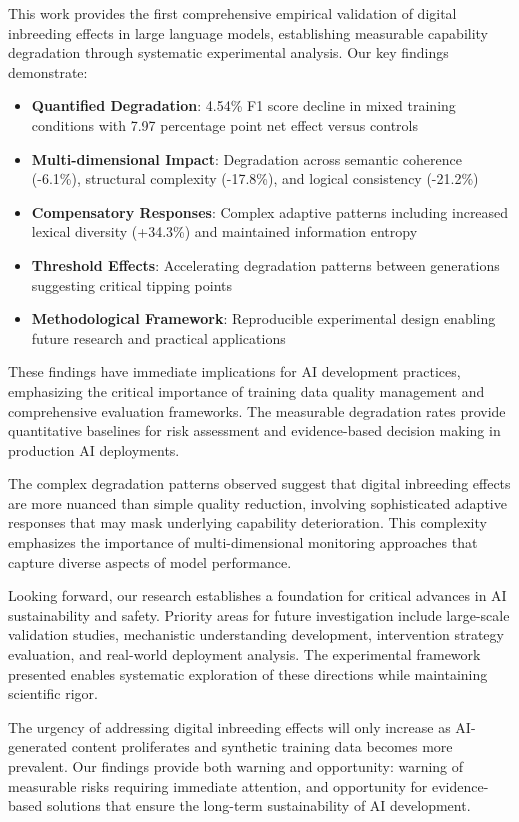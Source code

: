 \documentclass[11pt]{article}
\begin{document}
This work provides the first comprehensive empirical validation of digital inbreeding effects in large language models, establishing measurable capability degradation through systematic experimental analysis. Our key findings demonstrate:

\begin{itemize}
    \item \textbf{Quantified Degradation}: 4.54\% F1 score decline in mixed training conditions with 7.97 percentage point net effect versus controls
    \item \textbf{Multi-dimensional Impact}: Degradation across semantic coherence (-6.1\%), structural complexity (-17.8\%), and logical consistency (-21.2\%)
    \item \textbf{Compensatory Responses}: Complex adaptive patterns including increased lexical diversity (+34.3\%) and maintained information entropy
    \item \textbf{Threshold Effects}: Accelerating degradation patterns between generations suggesting critical tipping points
    \item \textbf{Methodological Framework}: Reproducible experimental design enabling future research and practical applications
\end{itemize}

These findings have immediate implications for AI development practices, emphasizing the critical importance of training data quality management and comprehensive evaluation frameworks. The measurable degradation rates provide quantitative baselines for risk assessment and evidence-based decision making in production AI deployments.

The complex degradation patterns observed suggest that digital inbreeding effects are more nuanced than simple quality reduction, involving sophisticated adaptive responses that may mask underlying capability deterioration. This complexity emphasizes the importance of multi-dimensional monitoring approaches that capture diverse aspects of model performance.

Looking forward, our research establishes a foundation for critical advances in AI sustainability and safety. Priority areas for future investigation include large-scale validation studies, mechanistic understanding development, intervention strategy evaluation, and real-world deployment analysis. The experimental framework presented enables systematic exploration of these directions while maintaining scientific rigor.

The urgency of addressing digital inbreeding effects will only increase as AI-generated content proliferates and synthetic training data becomes more prevalent. Our findings provide both warning and opportunity: warning of measurable risks requiring immediate attention, and opportunity for evidence-based solutions that ensure the long-term sustainability of AI development.
\end{document}
